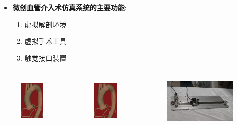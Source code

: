 \begin{frame}
\begin{itemize}
  \item \textbf{微创血管介入术仿真系统的主要功能}: 
  \begin{enumerate}
     \item 虚拟解剖环境
     \item 虚拟手术工具
     \item 触觉接口装置
  \end{enumerate}
\end{itemize}
\begin{columns}[b,onlytextwidth]
\begin{column}{.25\textwidth}
 \begin{figure}[t]
\centering
\includegraphics[height=1.0in]{../../Figures/background/simulation2.eps}
\end{figure}
\end{column}
\begin{column}{.25\textwidth}
 \begin{figure}[t]
\centering
\includegraphics[height=1.0in]{../../Figures/background/simulation.eps}
\end{figure}
\end{column}
\begin{column}{.5\textwidth}
 \begin{figure}[t]
\centering
\includegraphics[height=1.0in]{../../Figures/background/interface.eps}
\end{figure}
\end{column}
\end{columns}
\end{frame}

